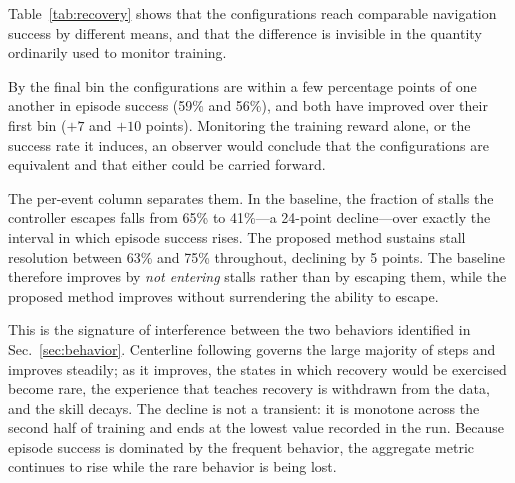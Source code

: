 %

Table~\ref{tab:recovery} shows that the configurations reach comparable navigation success by
different means, and that the difference is invisible in the quantity ordinarily used to monitor
training.

By the final bin the configurations are within a few percentage points of one another in episode
success (59\% and 56\%), and both have improved over their first bin ($+7$ and $+10$ points).
Monitoring the training reward alone, or the success rate it induces, an observer would conclude
that the configurations are equivalent and that either could be carried forward.

The per-event column separates them. In the baseline, the fraction of stalls the controller
escapes falls from 65\% to 41\%---a 24-point decline---over exactly the interval in which episode
success rises. The proposed method sustains stall resolution between 63\% and 75\% throughout,
declining by 5 points. The baseline therefore improves by \emph{not entering} stalls rather than
by escaping them, while the proposed method improves without surrendering the ability to escape.

This is the signature of interference between the two behaviors identified in
Sec.~\ref{sec:behavior}. Centerline following governs the large majority of steps and improves
steadily; as it improves, the states in which recovery would be exercised become rare, the
experience that teaches recovery is withdrawn from the data, and the skill decays. The decline is
not a transient: it is monotone across the second half of training and ends at the lowest value
recorded in the run. Because episode success is dominated by the frequent behavior, the aggregate
metric continues to rise while the rare behavior is being lost.

